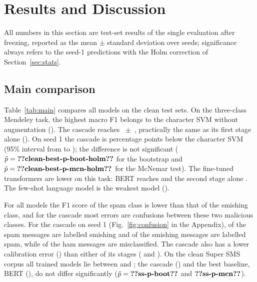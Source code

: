 \section{Results and Discussion}\label{sec:results}

All numbers in this section are test-set results of the single evaluation after freezing, reported as the mean $\pm$ standard deviation over  seeds; significance always refers to the seed-1 predictions with the Holm correction of Section~\ref{sec:stats}.

\subsection{Main comparison}\label{sec:main}



Table~\ref{tab:main} compares all models on the clean test sets. On the three-class Mendeley task, the highest macro F1 belongs to the character SVM without augmentation (). The cascade reaches ~$\pm$~, practically the same as its first stage alone (). On seed 1 the cascade is  percentage points below the character SVM (95\% interval from  to ); the difference is not significant ($\tilde{p}=\val{clean-best-p-boot-holm}$ for the bootstrap and $\tilde{p}=\val{clean-best-p-mcn-holm}$ for the McNemar test). The fine-tuned transformers are lower on this task: BERT reaches  and the second stage alone . The few-shot language model is the weakest model ().

For all models the F1 score of the spam class is lower than that of the smishing class, and for the cascade most errors are confusions between these two malicious classes. For the cascade on seed 1 (Fig.~\ref{fig:confusion} in the Appendix),  of the  spam messages are labelled smishing and  of the  smishing messages are labelled spam, while  of the  ham messages are misclassified. The cascade also has a lower calibration error () than either of its stages ( and ). On the clean Super SMS corpus all trained models lie between  and ; the cascade () and the best baseline, BERT (), do not differ significantly ($\tilde{p}=\val{ss-p-boot}$ and $\val{ss-p-mcn}$).

